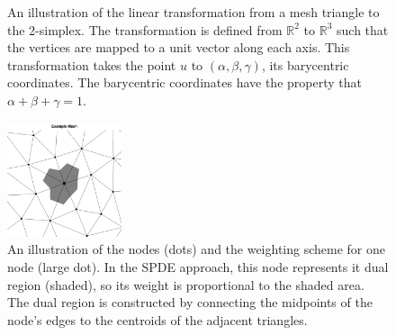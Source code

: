 \documentclass[]{interact}
\begin{document}
\begin{figure}[h!]\centering

\hspace{2em}

\caption{An illustration of the linear transformation from a mesh triangle to
the 2-simplex. The transformation is defined from \(\mathbb{R}^{2}\) to
\(\mathbb{R}^{3}\) such that the vertices are mapped to a unit vector along
each axis. This transformation takes the point \(u\) to
\((\alpha, \beta, \gamma)\), its barycentric coordinates. The barycentric
coordinates have the property that \(\alpha + \beta + \gamma = 1\).}
\label{triangle}
\end{figure}

\begin{figure}[t]\centering
\includegraphics[width=0.3\textwidth]{figures/dual.pdf}
\caption{An illustration of the nodes (dots) and the weighting scheme for one
node (large dot). In the SPDE approach, this node represents it dual region
(shaded), so its weight is proportional to the shaded area. The dual region is
constructed by connecting the midpoints of the node's edges to the centroids
of the adjacent triangles.}
\label{dual}
\end{figure}
\end{document}
